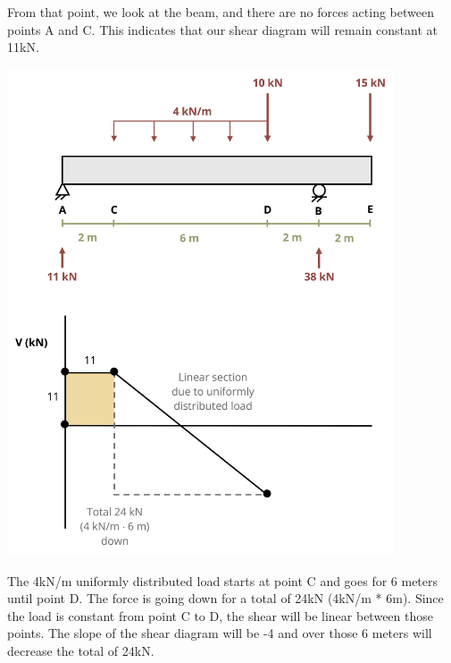 \documentclass[
  letterpaper,
  DIV=11,
  numbers=noendperiod]{scrreprt}
\begin{document}
\begin{tcolorbox}
\begin{tcolorbox}
From that point, we look at the beam, and there are no forces acting
between points A and C. This indicates that our shear diagram will
remain constant at 11kN.

\begin{center}
\includegraphics[width=4.51042in,height=\textheight]{images/CH7 PNGs/example 7.3 part 4.png}
\end{center}

The 4kN/m uniformly distributed load starts at point C and goes for 6
meters until point D. The force is going down for a total of 24kN (4kN/m
* 6m). Since the load is constant from point C to D, the shear will be
linear between those points. The slope of the shear diagram will be -4
and over those 6 meters will decrease the total of 24kN.


\end{tcolorbox}
\end{tcolorbox}
\end{document}
